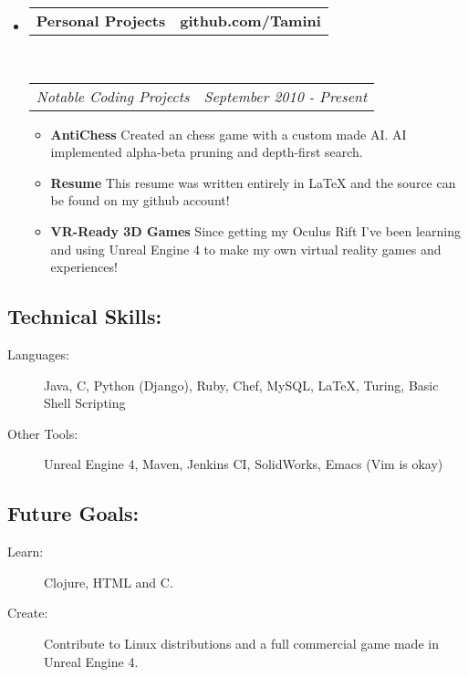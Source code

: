 \documentclass[11pt]{article} %
\makeatletter
\newcommand{\CPP}
{C\nolinebreak[4]\hspace{-.05em}\raisebox{.22ex}{\footnotesize\bf ++}}
\newcommand{\headerrow}[2]
{\begin{tabular*}{\linewidth}{l@{\extracolsep{\fill}}r}
	#1 &
	#2 \\
\end{tabular*}}
\makeatother
\begin{document}
\begin{itemize}
\begin{itemize}
	\end{itemize}
	\item
	\headerrow
		{\textbf{Personal Projects}}
		{\textbf{github.com/Tamini}}
	\\
	\headerrow
		{\emph{Notable Coding Projects}}
		{\emph{September 2010 - Present}}
	\begin{itemize}
		\item {\bf AntiChess} Created an chess game with a custom made AI. AI implemented alpha-beta pruning and depth-first search.
		\item {\bf Resume} This resume was written entirely in LaTeX and the source can be found on my github account!
		\item {\bf VR-Ready 3D Games} Since getting my Oculus Rift I've been learning and using Unreal Engine 4 to make my own virtual reality games and experiences!
	\end{itemize}

\end{itemize}
\subsection*{Technical Skills:}
\begin{description}
	\item[Languages:] Java, \CPP, Python (Django), Ruby, Chef, MySQL, \LaTeX, Turing, Basic Shell Scripting
	\item[Other Tools:] Unreal Engine 4, Maven, Jenkins CI, SolidWorks, Emacs (Vim is okay)
\end{description}
\subsection*{Future Goals:}
\begin{description}
	\item[Learn:] Clojure, HTML and C.
	\item[Create:] Contribute to Linux distributions and a full commercial game made in Unreal Engine 4.
\end{description}
\end{document}
